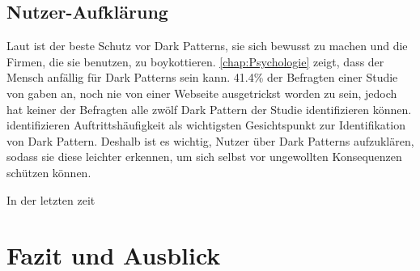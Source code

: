 \documentclass[conference,compsoc,final,a4paper]{IEEEtran}
\begin{document}
\subsection{Nutzer-Aufklärung}
Laut \citeauthor{Brignull} \autocite{Brignull} ist der beste Schutz vor Dark Patterns, sie sich bewusst zu machen und die Firmen, die sie benutzen, zu boykottieren. \autoref{chap:Psychologie} zeigt, dass der Mensch anfällig für Dark Patterns sein kann. 41.4\% der Befragten einer Studie von \citeauthor{M.Bhoot2020} \autocite{M.Bhoot2020} gaben an, noch nie von einer Webseite ausgetrickst worden zu sein, jedoch hat keiner der Befragten alle zwölf Dark Pattern der Studie identifizieren können. \citeauthor{M.Bhoot2020} identifizieren Auftrittshäufigkeit als wichtigsten Gesichtspunkt zur Identifikation von Dark Pattern. Deshalb ist es wichtig, Nutzer über Dark Patterns aufzuklären, sodass sie diese leichter erkennen, um sich selbst vor ungewollten Konsequenzen schützen können.

In der letzten zeit 

\section{Fazit und Ausblick}


\end{document}
